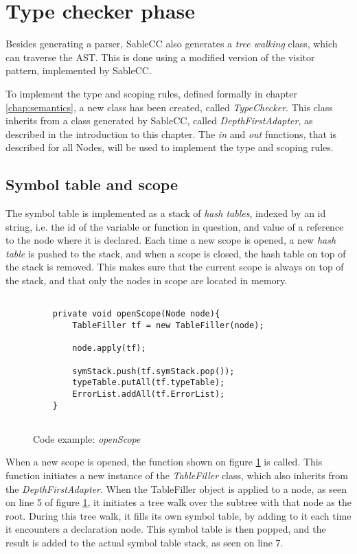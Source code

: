 \section{Type checker phase}
\label{sec:semanticAnal}
Besides generating a parser, SableCC also generates a \textit{tree walking} class, which can traverse the AST. This is done using a modified version of the visitor pattern, implemented by SableCC. 

To implement the type and scoping rules, defined formally in chapter \ref{chap:semantics}, a new class has been created, called \textit{TypeChecker}. This class inherits from a class generated by SableCC, called \textit{DepthFirstAdapter}, as described in the introduction to this chapter.  The \textit{in} and \textit{out} functions, that is described for all Nodes, will be used to implement the type and scoping rules. 

\subsection{Symbol table and scope}
The symbol table is implemented as a stack of \textit{hash tables}, indexed by an id string, i.e. the id of the variable or function in question, and value of a reference to the node where it is declared. Each time a new scope is opened, a new \textit{hash table} is pushed to the stack, and when a scope is closed, the hash table on top of the stack is removed. This makes sure that the current scope is always on top of the stack, and that only the nodes in scope are located in memory. 


\begin{figure}[H]
\centering
\begin{lstlisting}[]

    private void openScope(Node node){
        TableFiller tf = new TableFiller(node);

        node.apply(tf);

        symStack.push(tf.symStack.pop());
        typeTable.putAll(tf.typeTable);
        ErrorList.addAll(tf.ErrorList);
    }
    
\end{lstlisting}
\caption{Code example: \textit{openScope}}
\label{fig:openscope}
\end{figure}

When a new scope is opened, the function shown on figure \ref{fig:openscope} is called. This function initiates a new instance of the \textit{TableFiller} class, which also inherits from the \textit{DepthFirstAdapter}. When the TableFiller object is applied to a node, as seen on line 5 of figure \ref{fig:openscope}, it initiates a tree walk over the subtree with that node as the root. During this tree walk, it fills its own symbol table, by adding to it each time it encounters a declaration node. This symbol table is then popped, and the result is added to the actual symbol table stack, as seen on line 7.

